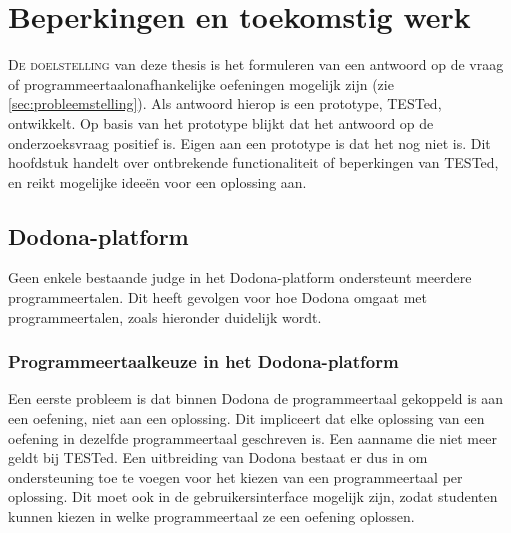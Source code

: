 \chapter{Beperkingen en toekomstig werk}\label{ch:beperkingen-en-toekomstig-werk}

\lettrine{D}{e doelstelling} van deze thesis is het formuleren van een antwoord op de vraag of programmeertaalonafhankelijke oefeningen mogelijk zijn (zie \cref{sec:probleemstelling}).
Als antwoord hierop is een prototype, TESTed, ontwikkelt.
Op basis van het prototype blijkt dat het antwoord op de onderzoeksvraag positief is.
Eigen aan een prototype is dat het nog niet  is.
Dit hoofdstuk handelt over ontbrekende functionaliteit of beperkingen van TESTed, en reikt mogelijke ideeën voor een oplossing aan.

\section{Dodona-platform}\label{sec:dodona-platform}

Geen enkele bestaande judge in het Dodona-platform ondersteunt meerdere programmeertalen.
Dit heeft gevolgen voor hoe Dodona omgaat met programmeertalen, zoals hieronder duidelijk wordt.

\subsection{Programmeertaalkeuze in het Dodona-platform}\label{subsec:programmeertaalkeuze-in-het-dodona-platform}

Een eerste probleem is dat binnen Dodona de programmeertaal gekoppeld is aan een oefening, niet aan een oplossing.
Dit impliceert dat elke oplossing van een oefening in dezelfde programmeertaal geschreven is.
Een aanname die niet meer geldt bij TESTed.
Een uitbreiding van Dodona bestaat er dus in om ondersteuning toe te voegen voor het kiezen van een programmeertaal per oplossing.
Dit moet ook in de gebruikersinterface mogelijk zijn, zodat studenten kunnen kiezen in welke programmeertaal ze een oefening oplossen.

